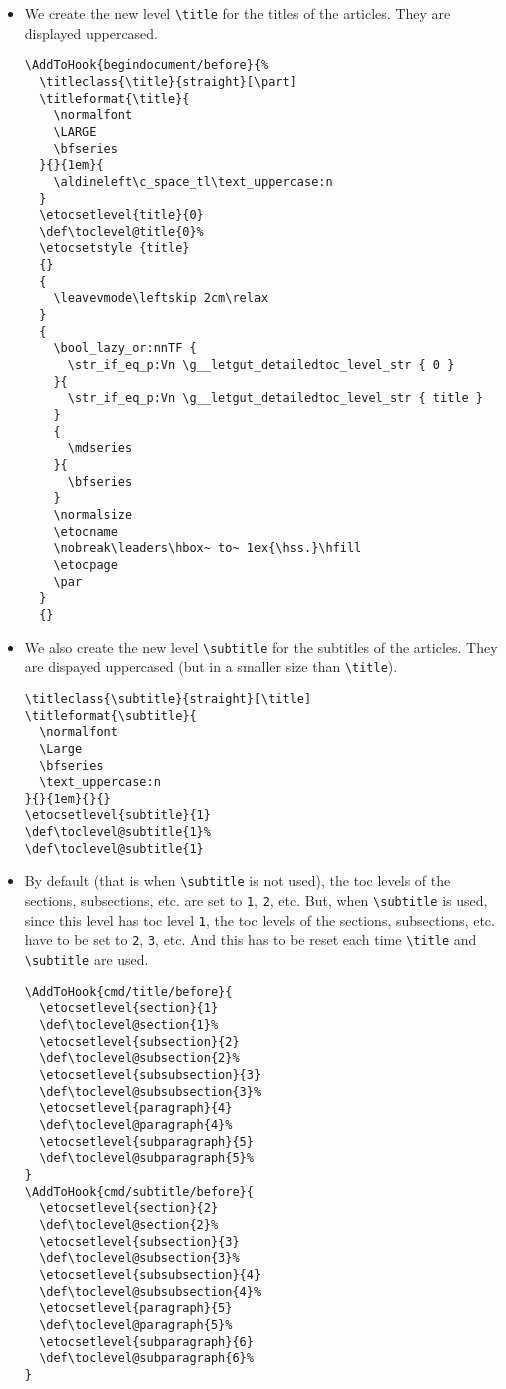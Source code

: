 \documentclass{letgut}
\begin{document}
\begin{itemize}
\item We create the new level \lstinline+\title+ for the titles of the articles. They are
displayed uppercased.

\begin{lstlisting}
\AddToHook{begindocument/before}{%
  \titleclass{\title}{straight}[\part]
  \titleformat{\title}{
    \normalfont
    \LARGE
    \bfseries
  }{}{1em}{
    \aldineleft\c_space_tl\text_uppercase:n
  }
  \etocsetlevel{title}{0}
  \def\toclevel@title{0}%
  \etocsetstyle {title}
  {}
  {
    \leavevmode\leftskip 2cm\relax
  }
  {
    \bool_lazy_or:nnTF {
      \str_if_eq_p:Vn \g__letgut_detailedtoc_level_str { 0 }
    }{
      \str_if_eq_p:Vn \g__letgut_detailedtoc_level_str { title }
    }
    {
      \mdseries
    }{
      \bfseries
    }
    \normalsize
    \etocname
    \nobreak\leaders\hbox~ to~ 1ex{\hss.}\hfill
    \etocpage
    \par
  }
  {}
\end{lstlisting}
\item We also create the new level \lstinline+\subtitle+ for the subtitles of the
articles. They are dispayed uppercased (but in a smaller size than \lstinline+\title+).
\begin{lstlisting}
\titleclass{\subtitle}{straight}[\title]
\titleformat{\subtitle}{
  \normalfont
  \Large
  \bfseries
  \text_uppercase:n
}{}{1em}{}{}
\etocsetlevel{subtitle}{1}
\def\toclevel@subtitle{1}%
\def\toclevel@subtitle{1}
\end{lstlisting}
\item By default (that is when \lstinline+\subtitle+ is not used), the toc levels of the
sections, subsections, etc. are set to \lstinline+1+, \lstinline+2+, etc. But, when \lstinline+\subtitle+ is
used, since this level has toc level \lstinline+1+, the toc levels of the sections,
subsections, etc. have to be set to \lstinline+2+, \lstinline+3+, etc. And this has to be reset
each time \lstinline+\title+ and  \lstinline+\subtitle+ are used.
\begin{lstlisting}
\AddToHook{cmd/title/before}{
  \etocsetlevel{section}{1}
  \def\toclevel@section{1}%
  \etocsetlevel{subsection}{2}
  \def\toclevel@subsection{2}%
  \etocsetlevel{subsubsection}{3}
  \def\toclevel@subsubsection{3}%
  \etocsetlevel{paragraph}{4}
  \def\toclevel@paragraph{4}%
  \etocsetlevel{subparagraph}{5}
  \def\toclevel@subparagraph{5}%
}
\AddToHook{cmd/subtitle/before}{
  \etocsetlevel{section}{2}
  \def\toclevel@section{2}%
  \etocsetlevel{subsection}{3}
  \def\toclevel@subsection{3}%
  \etocsetlevel{subsubsection}{4}
  \def\toclevel@subsubsection{4}%
  \etocsetlevel{paragraph}{5}
  \def\toclevel@paragraph{5}%
  \etocsetlevel{subparagraph}{6}
  \def\toclevel@subparagraph{6}%
}
\end{lstlisting}


\end{itemize}
\end{document}
